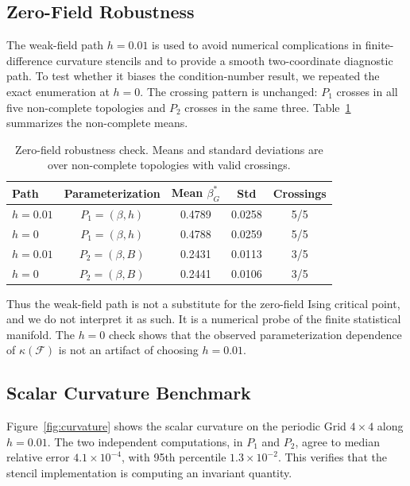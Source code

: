 \documentclass[11pt,a4paper]{article}
\begin{document}
\subsection{Zero-Field Robustness}
\label{subsec:h0}

The weak-field path $h=0.01$ is used to avoid numerical complications in finite-difference curvature stencils and to provide a smooth two-coordinate diagnostic path.  To test whether it biases the condition-number result, we repeated the exact enumeration at $h=0$.  The crossing pattern is unchanged: $P_1$ crosses in all five non-complete topologies and $P_2$ crosses in the same three.  Table~\ref{tab:h0_check} summarizes the non-complete means.

\begin{table}[ht]
\centering
\caption{Zero-field robustness check.  Means and standard deviations are over non-complete topologies with valid crossings.}
\label{tab:h0_check}
\begin{tabular}{lcccc}
\toprule
Path & Parameterization & Mean $\beta_G^*$ & Std & Crossings\\
\midrule
$h=0.01$ & $P_1=(\beta,h)$ & 0.4789 & 0.0258 & 5/5\\
$h=0$ & $P_1=(\beta,h)$ & 0.4788 & 0.0259 & 5/5\\
$h=0.01$ & $P_2=(\beta,B)$ & 0.2431 & 0.0113 & 3/5\\
$h=0$ & $P_2=(\beta,B)$ & 0.2441 & 0.0106 & 3/5\\
\bottomrule
\end{tabular}
\end{table}

Thus the weak-field path is not a substitute for the zero-field Ising critical point, and we do not interpret it as such.  It is a numerical probe of the finite statistical manifold.  The $h=0$ check shows that the observed parameterization dependence of $\kappa(\mathcal F)$ is not an artifact of choosing $h=0.01$.

\subsection{Scalar Curvature Benchmark}
\label{subsec:curvature}

Figure~\ref{fig:curvature} shows the scalar curvature on the periodic Grid $4\times4$ along $h=0.01$.  The two independent computations, in $P_1$ and $P_2$, agree to median relative error $4.1\times10^{-4}$, with 95th percentile $1.3\times10^{-2}$.  This verifies that the stencil implementation is computing an invariant quantity.
\end{document}
